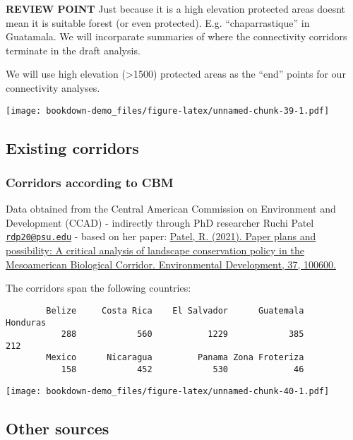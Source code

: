 \documentclass[
]{book}
\begin{document}
\textbf{REVIEW POINT}
Just because it is a high elevation protected areas doesnt mean it is suitable forest (or even protected). E.g. ``chaparrastique'' in Guatamala. We will incorparate summaries of where the connectivity corridors terminate in the draft analysis.

We will use high elevation (\textgreater1500) protected areas as the ``end'' points for our connectivity analyses.

\texttt{[image: bookdown-demo\_files/figure-latex/unnamed-chunk-39-1.pdf]}

\hypertarget{existing-corridors}{%
\subsection{Existing corridors}\label{existing-corridors}}

\hypertarget{corridors-according-to-cbm}{%
\subsubsection{Corridors according to CBM}\label{corridors-according-to-cbm}}

Data obtained from the Central American Commission on Environment and Development (CCAD) - indirectly through PhD researcher Ruchi Patel \href{mailto:rdp20@psu.edu}{\nolinkurl{rdp20@psu.edu}} - based on her paper: \href{https://www.sciencedirect.com/science/article/pii/S2211464520301329}{Patel, R. (2021). Paper plans and possibility: A critical analysis of landscape conservation policy in the Mesoamerican Biological Corridor. Environmental Development, 37, 100600.}

The corridors span the following countries:

\begin{verbatim}
        Belize     Costa Rica    El Salvador      Guatemala       Honduras 
           288            560           1229            385            212 
        Mexico      Nicaragua         Panama Zona Froteriza 
           158            452            530             46 
\end{verbatim}

\texttt{[image: bookdown-demo\_files/figure-latex/unnamed-chunk-40-1.pdf]}

\hypertarget{other-sources}{%
\subsection{Other sources}\label{other-sources}}
\end{document}
